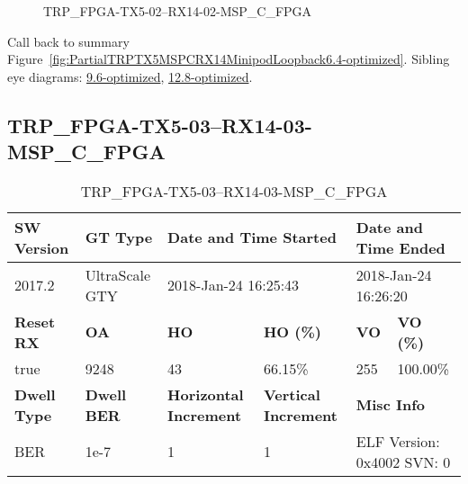 \begin{figure}[h]
\caption{TRP\_FPGA-TX5-02--RX14-02-MSP\_C\_FPGA} \label{fig:TRPFPGATX502RX1402MSPCFPGA6.4-optimized}
\end{figure}

Call back to summary Figure~\ref{fig:PartialTRPTX5MSPCRX14MinipodLoopback6.4-optimized}.
Sibling eye diagrams: \hyperref[sec:TRPFPGATX502RX1402MSPCFPGA9.6-optimized]{9.6-optimized}, \hyperref[sec:TRPFPGATX502RX1402MSPCFPGA12.8-optimized]{12.8-optimized}.

\clearpage
\newpage


\subsection{TRP\_FPGA-TX5-03--RX14-03-MSP\_C\_FPGA}\label{sec:TRPFPGATX503RX1403MSPCFPGA6.4-optimized}

\begin{table}[h]
\centering
\caption{TRP\_FPGA-TX5-03--RX14-03-MSP\_C\_FPGA}
\label{tab:TRPFPGATX503RX1403MSPCFPGA6.4-optimized}
\begin{tabular}{@{}|l|l|l|l|l|l|@{}}
\toprule
\textbf{SW Version}                & \textbf{GT Type}   & \multicolumn{2}{l|}{\textbf{Date and Time Started}}            & \multicolumn{2}{l|}{\textbf{Date and Time Ended}}        \\ \midrule
2017.2                       & UltraScale GTY          & \multicolumn{2}{l|}{2018-Jan-24 16:25:43}                   & \multicolumn{2}{l|}{2018-Jan-24 16:26:20}               \\ \midrule
\textbf{Reset RX}                  & \textbf{OA} & \textbf{HO}   & \textbf{HO (\%)} & \textbf{VO} & \textbf{VO (\%)} \\ \midrule
true & 9248        & 43          & 66.15\%        & 255        & 100.00\%       \\ \midrule
\textbf{Dwell Type}                & \textbf{Dwell BER} & \textbf{Horizontal Increment} & \textbf{Vertical Increment}    & \multicolumn{2}{l|}{\textbf{Misc Info}}                  \\ \midrule
BER                            & 1e-7        & 1        & 1           & \multicolumn{2}{l|}{ELF Version: 0x4002 SVN: 0}                         \\ \bottomrule
\end{tabular}
\end{table}

